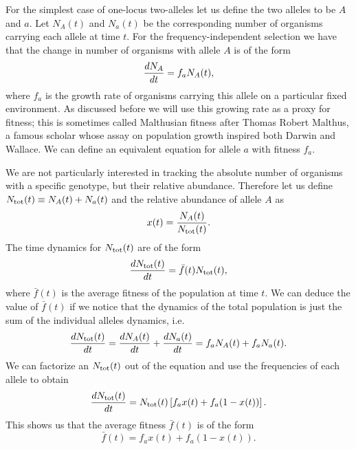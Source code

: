 For the simplest case of one-locus two-alleles let us define the two alleles to
be $A$ and $a$. Let $N_A(t)$ and $N_a(t)$ be the corresponding number of
organisms carrying each allele at time $t$. For the frequency-independent 
selection we have that the change in number of organisms with allele $A$ is of
the form
\begin{equation}
  {d{N_A} \over dt} = f_a N_A(t),
\end{equation}
where $f_a$ is the growth rate of organisms carrying this allele on a
particular fixed environment. As discussed before we will use this growing rate
as a proxy for fitness; this is sometimes called Malthusian fitness after
Thomas Robert Malthus, a famous scholar whose assay on population growth
inspired both Darwin and Wallace. We can define an equivalent equation for
allele $a$ with fitness $f_a$.

We are not particularly interested in tracking the absolute number of organisms
with a specific genotype, but their relative abundance. Therefore let us define
$N_{\text{tot}}(t) \equiv N_A(t) + N_a(t)$ and the relative abundance of allele $A$ as
\begin{equation}
  x(t) = {N_A(t) \over N_{\text{tot}}(t)}.
\end{equation}
The time dynamics for $N_{\text{tot}}(t)$ are of the form
\begin{equation}
  {d{N_{\text{tot}}(t)} \over dt} = \bar{f}(t) N_{\text{tot}}(t),
\end{equation}
where $\bar{f}(t)$ is the average fitness of the population at time $t$. We can
deduce the value of $\bar{f}(t)$ if we notice that the dynamics of the total
population is just the sum of the individual alleles dynamics, i.e.
\begin{equation}
  {d{N_{\text{tot}}(t)} \over dt} = {d{N_A(t)} \over dt} + {d{N_a(t)} \over dt} = f_a N_A(t) + f_a N_a(t).
\end{equation}
We can factorize an $N_{\text{tot}}(t)$ out of the equation and use the frequencies of
each allele to obtain
\begin{equation}
  {d{N_{\text{tot}}(t)} \over dt} = N_{\text{tot}}(t) \left[ f_a x(t) + f_a (1 - x(t)) \right].
\end{equation}
This shows us that the average fitness $\bar{f}(t)$ is of the form
\begin{equation}
  \bar{f}(t) = f_a x(t) + f_a (1 - x(t)).
\end{equation}

